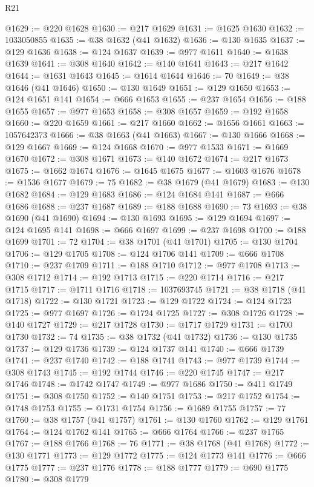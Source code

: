 \begin{lexlean}{R21}
\begin{coremodule}
@1629 := @220 @1628
@1630 := @217 @1629
@1631 := @1625 @1630
@1632 := 1033050855
@1635 := @38 @1632 (@41 @1632)
@1636 := @130 @1635
@1637 := @129 @1636
@1638 := @124 @1637
@1639 := @977 @1611
@1640 := @1638 @1639
@1641 := @308 @1640
@1642 := @140 @1641
@1643 := @217 @1642
@1644 := @1631 @1643
@1645 := @1614 @1644
@1646 := 70
@1649 := @38 @1646 (@41 @1646)
@1650 := @130 @1649
@1651 := @129 @1650
@1653 := @124 @1651 @141
@1654 := @666 @1653
@1655 := @237 @1654
@1656 := @188 @1655
@1657 := @977 @1653
@1658 := @308 @1657
@1659 := @192 @1658
@1660 := @220 @1659
@1661 := @217 @1660
@1662 := @1656 @1661
@1663 := 1057642373
@1666 := @38 @1663 (@41 @1663)
@1667 := @130 @1666
@1668 := @129 @1667
@1669 := @124 @1668
@1670 := @977 @1533
@1671 := @1669 @1670
@1672 := @308 @1671
@1673 := @140 @1672
@1674 := @217 @1673
@1675 := @1662 @1674
@1676 := @1645 @1675
@1677 := @1603 @1676
@1678 := @1536 @1677
@1679 := 75
@1682 := @38 @1679 (@41 @1679)
@1683 := @130 @1682
@1684 := @129 @1683
@1686 := @124 @1684 @141
@1687 := @666 @1686
@1688 := @237 @1687
@1689 := @188 @1688
@1690 := 73
@1693 := @38 @1690 (@41 @1690)
@1694 := @130 @1693
@1695 := @129 @1694
@1697 := @124 @1695 @141
@1698 := @666 @1697
@1699 := @237 @1698
@1700 := @188 @1699
@1701 := 72
@1704 := @38 @1701 (@41 @1701)
@1705 := @130 @1704
@1706 := @129 @1705
@1708 := @124 @1706 @141
@1709 := @666 @1708
@1710 := @237 @1709
@1711 := @188 @1710
@1712 := @977 @1708
@1713 := @308 @1712
@1714 := @192 @1713
@1715 := @220 @1714
@1716 := @217 @1715
@1717 := @1711 @1716
@1718 := 1037693745
@1721 := @38 @1718 (@41 @1718)
@1722 := @130 @1721
@1723 := @129 @1722
@1724 := @124 @1723
@1725 := @977 @1697
@1726 := @1724 @1725
@1727 := @308 @1726
@1728 := @140 @1727
@1729 := @217 @1728
@1730 := @1717 @1729
@1731 := @1700 @1730
@1732 := 74
@1735 := @38 @1732 (@41 @1732)
@1736 := @130 @1735
@1737 := @129 @1736
@1739 := @124 @1737 @141
@1740 := @666 @1739
@1741 := @237 @1740
@1742 := @188 @1741
@1743 := @977 @1739
@1744 := @308 @1743
@1745 := @192 @1744
@1746 := @220 @1745
@1747 := @217 @1746
@1748 := @1742 @1747
@1749 := @977 @1686
@1750 := @411 @1749
@1751 := @308 @1750
@1752 := @140 @1751
@1753 := @217 @1752
@1754 := @1748 @1753
@1755 := @1731 @1754
@1756 := @1689 @1755
@1757 := 77
@1760 := @38 @1757 (@41 @1757)
@1761 := @130 @1760
@1762 := @129 @1761
@1764 := @124 @1762 @141
@1765 := @666 @1764
@1766 := @237 @1765
@1767 := @188 @1766
@1768 := 76
@1771 := @38 @1768 (@41 @1768)
@1772 := @130 @1771
@1773 := @129 @1772
@1775 := @124 @1773 @141
@1776 := @666 @1775
@1777 := @237 @1776
@1778 := @188 @1777
@1779 := @690 @1775
@1780 := @308 @1779

\end{coremodule}
\end{lexlean}
